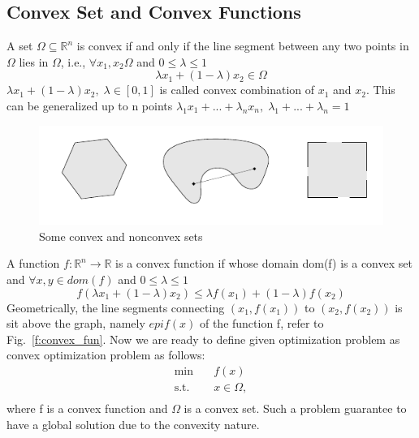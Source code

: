\documentclass[12pt]{article}%
\begin{document}
\subsection{Convex Set and Convex Functions}
A set $\Omega \subseteq \mathbb{R}^n$ is convex if and only if the line segment between any two points in $\Omega$ lies in $\Omega$, i.e., $\forall x_1,x_2 \Omega$ and $0 \leq \lambda \leq 1$
\begin{equation}
    \lambda x_1 + (1-\lambda)x_2 \in \Omega
\end{equation}$ \lambda x_1 + (1-\lambda)x_2, \; \lambda \in [0,1]$ is called convex combination of $x_1$ and $x_2$. This can be generalized up to n points $\lambda_1 x_1 + ... + \lambda_n x_n, \; \lambda_1 + ...+ \lambda_n = 1$
\begin{figure}[H]
    \begin{center}
    \includegraphics[width=12cm]{convex_set_non.png}
    \caption{Some convex and nonconvex sets~\cite{boyd2004convex}}
    \end{center}
\end{figure}

A function $f:\mathbb{R}^n \rightarrow \mathbb{R}$ is a convex function if whose domain dom(f) is a convex set and $\forall x,y \in dom(f)$ and $0 \leq \lambda \leq 1$
\begin{equation}
    f(\lambda x_1 + (1-\lambda)x_2) \leq \lambda f(x_1) + (1-\lambda)f(x_2)
\end{equation} Geometrically, the line segments connecting $(x_1, f(x_1))$ to $(x_2, f(x_2))$ is sit above the graph, namely $epi f(x)$ of the function f, refer to Fig.~\ref{f:convex_fun}. Now we are ready to define given optimization problem as convex optimization problem as follows:
\begin{equation}
\begin{aligned}
\min_{} \quad & f(x)\\
\textrm{s.t.} \quad & x \in \Omega,\\
\end{aligned}
\end{equation} where f is a convex function and $\Omega$ is a convex set. Such a problem guarantee to have a global solution due to the convexity nature. 
\end{document}
